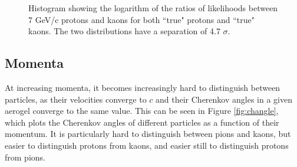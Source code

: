 \begin{figure}[]
\centering
{}
\caption[Particle identification separation for 7 GeV/c kaons and protons]{Histogram showing the logarithm of the ratios of likelihoods between 7 GeV/c protons and kaons for both ``true" protons and ``true" kaons. The two distributions have a separation of  4.7 $\sigma$.}
\label{fig:kaonprotonsep} 
\end{figure}

\subsection{Momenta}

At increasing momenta, it becomes increasingly hard to distinguish between particles, as their velocities converge to $c$ and their Cherenkov angles in a given aerogel converge to the same value. 
This can be seen in Figure \ref{fig:changle}, which plots the Cherenkov angles of different particles as a function of their momentum.
It is particularly hard to distinguish between pions and kaons, but easier to distinguish protons from kaons, and easier still to distinguish protons from pions.

